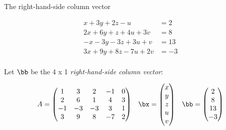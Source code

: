 \documentclass{beamer}
\begin{document}
\begin{frame}{The right-hand-side column vector}

\begin{align*}
 x + 3y + 2z - u  \qquad &= 2 \\
2x + 6y + z + 4u + 3v  &= 8 \\
-x -3y  -3z + 3u + v  &= 13 \\
3x + 9y + 8z  -7u + 2v  &= -3 \\
\end{align*}

Let $\bb$ be the 4 x 1  \emph{right-hand-side column vector}:

$$
\begin{matrix}
A =
\begin{pmatrix}
1 & 3 & 2 & -1 & 0 \\
2 & 6 & 1 & 4 & 3\\
-1 & -3 & -3 & 3 & 1 \\
3 & 9 & 8 & -7 & 2
\end{pmatrix}
&
\bx =
\begin{pmatrix}
x \\ y \\ z \\ u \\ v
\end{pmatrix}
&
\bb =
\begin{pmatrix}
2 \\ 8 \\ 13 \\ -3
\end{pmatrix}
\end{matrix}
$$

\end{frame}

\end{document}
